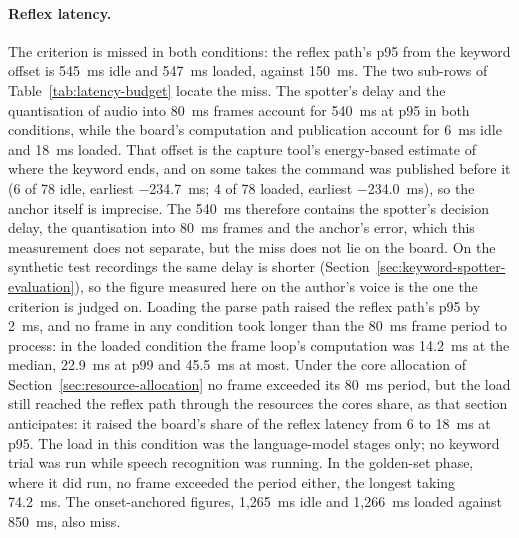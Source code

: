 

\paragraph{Reflex latency.} The criterion is missed in both conditions: the reflex path's p95 from
the keyword offset is 545~ms idle and 547~ms loaded, against 150~ms. The two sub-rows of
Table~\ref{tab:latency-budget} locate the miss. The spotter's delay and the quantisation of audio
into 80~ms frames account for 540~ms at p95 in both conditions, while the board's computation and
publication account for 6~ms idle and 18~ms loaded. That offset is the capture tool's energy-based
estimate of where the keyword ends, and on some takes the command was published before it (6 of 78
idle, earliest
$-$234.7~ms; 4 of 78 loaded, earliest $-$234.0~ms), so the anchor itself is imprecise. The 540~ms
therefore contains the spotter's decision delay, the quantisation into 80~ms frames and the anchor's
error, which this measurement does not separate, but the miss does not lie on the board. On the
synthetic test recordings the same delay is shorter (Section~\ref{sec:keyword-spotter-evaluation}),
so the figure measured here on the author's voice is the one the criterion is judged on. Loading the
parse path raised the reflex path's p95 by 2~ms, and no frame in any condition took longer than the
80~ms frame period to process: in the loaded condition the frame loop's computation was 14.2~ms at
the median, 22.9~ms at p99 and 45.5~ms at most. Under the core allocation of
Section~\ref{sec:resource-allocation} no frame exceeded its 80~ms period, but the load still reached
the reflex path through the resources the cores share, as that section anticipates: it raised the
board's share of the reflex latency from 6 to 18~ms at p95. The load in this condition was the
language-model stages only; no keyword trial was run while speech recognition was running. In the
golden-set phase, where it did run, no frame exceeded the period either, the longest taking 74.2~ms.
The onset-anchored figures, 1{,}265~ms idle and 1{,}266~ms loaded against 850~ms, also miss.

